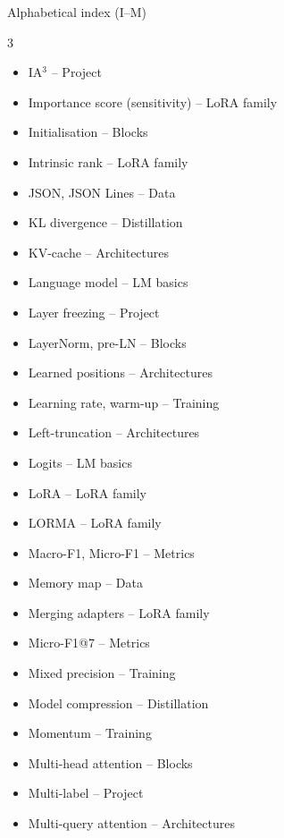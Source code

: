 \documentclass[aspectratio=169,11pt]{beamer}
\begin{document}
\begin{frame}{Alphabetical index (I--M)}
  \footnotesize
  \begin{multicols}{3}
  \begin{itemize}\setlength{\itemsep}{0pt}
    \item IA$^3$ -- Project
    \item Importance score (sensitivity) -- LoRA family
    \item Initialisation -- Blocks
    \item Intrinsic rank -- LoRA family
    \item JSON, JSON Lines -- Data
    \item KL divergence -- Distillation
    \item KV-cache -- Architectures
    \item Language model -- LM basics
    \item Layer freezing -- Project
    \item LayerNorm, pre-LN -- Blocks
    \item Learned positions -- Architectures
    \item Learning rate, warm-up -- Training
    \item Left-truncation -- Architectures
    \item Logits -- LM basics
    \item LoRA -- LoRA family
    \item LORMA -- LoRA family
    \item Macro-F1, Micro-F1 -- Metrics
    \item Memory map -- Data
    \item Merging adapters -- LoRA family
    \item Micro-F1@7 -- Metrics
    \item Mixed precision -- Training
    \item Model compression -- Distillation
    \item Momentum -- Training
    \item Multi-head attention -- Blocks
    \item Multi-label -- Project
    \item Multi-query attention -- Architectures
  \end{itemize}
  \end{multicols}
\end{frame}
\end{document}
